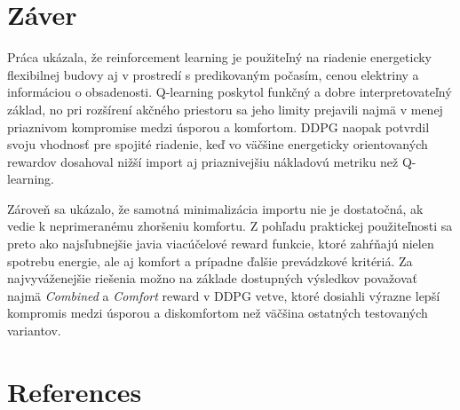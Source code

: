 \documentclass[conference]{IEEEtran}
\begin{document}
\section{Záver}

Práca ukázala, že reinforcement learning je použiteľný na riadenie energeticky flexibilnej budovy aj v prostredí s predikovaným počasím, cenou elektriny a informáciou o obsadenosti. Q-learning poskytol funkčný a dobre interpretovateľný základ, no pri rozšírení akčného priestoru sa jeho limity prejavili najmä v menej priaznivom kompromise medzi úsporou a komfortom. DDPG naopak potvrdil svoju vhodnosť pre spojité riadenie, keď vo väčšine energeticky orientovaných rewardov dosahoval nižší import aj priaznivejšiu nákladovú metriku než Q-learning.

Zároveň sa ukázalo, že samotná minimalizácia importu nie je dostatočná, ak vedie k neprimeranému zhoršeniu komfortu. Z pohľadu praktickej použiteľnosti sa preto ako najsľubnejšie javia viacúčelové reward funkcie, ktoré zahŕňajú nielen spotrebu energie, ale aj komfort a prípadne ďalšie prevádzkové kritériá. Za najvyváženejšie riešenia možno na základe dostupných výsledkov považovať najmä \textit{Combined} a \textit{Comfort} reward v DDPG vetve, ktoré dosiahli výrazne lepší kompromis medzi úsporou a diskomfortom než väčšina ostatných testovaných variantov.


\section*{References}
\end{document}
